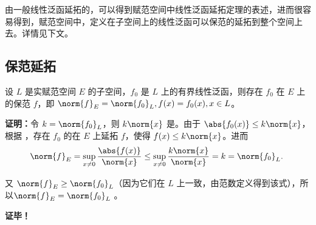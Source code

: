 

由一般线性泛函延拓的，可以得到赋范空间中线性泛函延拓定理的表述，进而很容易得到，赋范空间中，定义在子空间上的线性泛函可以保范的延拓到整个空间上去。详情见下文。

\subsection{保范延拓}

\begin{theorem}{}
设 $L$ 是实赋范空间 $E$ 的子空间，$f_0$ 是 $L$ 上的有界线性泛函，则存在 $f_0$ 在 $E$ 上的保范 $f$，即 $\norm{f}_{E}=\norm{f_0}_{L},f(x)=f_0(x),x\in L$。
\end{theorem}

\textbf{证明：}令 $k=\norm{f_0}_{L}$，则 $k\norm{x}$ 是。由于 $\abs{f_0(x)}\leq k\norm{x}$，根据 ，存在 $f_0$ 的在 $E$ 上延拓 $f$，使得 $f(x)\leq k\norm{x}$。进而
\begin{equation}
\norm{f}_E=\sup_{x\neq0}\frac{\abs{f(x)}}{\norm{x}}\leq\sup_{x\neq0}\frac{k\norm{x}}{\norm{x}}=k=\norm{f_0}_L.~
\end{equation}
 
又 $\norm{f}_E\geq \norm{f_0}_L$（因为它们在 $L$ 上一致，由范数定义得到该式），所以$\norm{f}_{E}=\norm{f_0}_{L}$ 。

\textbf{证毕！}
